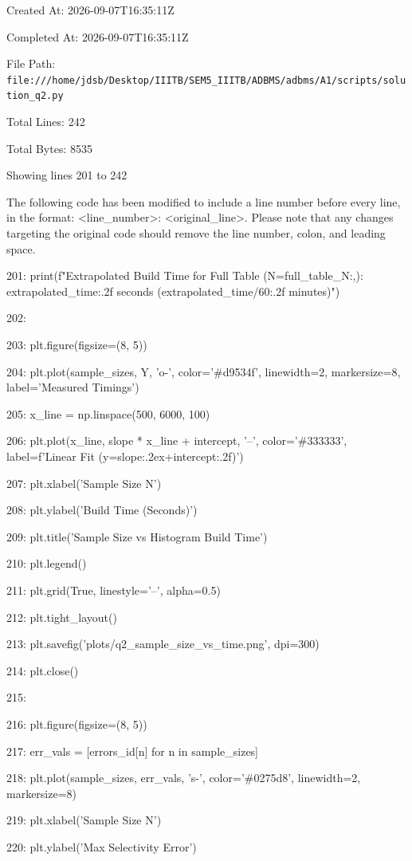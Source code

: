 \documentclass[11pt,a4paper]{article}
\begin{document}
Created At: 2026-09-07T16:35:11Z

Completed At: 2026-09-07T16:35:11Z

File Path: \texttt{file:///home/jdsb/Desktop/IIITB/SEM5\_IIITB/ADBMS/adbms/A1/scripts/solution\_q2.py}

Total Lines: 242

Total Bytes: 8535

Showing lines 201 to 242

The following code has been modified to include a line number before every line, in the format: <line\_number>: <original\_line>. Please note that any changes targeting the original code should remove the line number, colon, and leading space.

201:     print(f"Extrapolated Build Time for Full Table (N={full\_table\_N:,}): {extrapolated\_time:.2f} seconds ({extrapolated\_time/60:.2f} minutes)")

202:

203:     plt.figure(figsize=(8, 5))

204:     plt.plot(sample\_sizes, Y, 'o-', color='\#d9534f', linewidth=2, markersize=8, label='Measured Timings')

205:     x\_line = np.linspace(500, 6000, 100)

206:     plt.plot(x\_line, slope * x\_line + intercept, '--', color='\#333333', label=f'Linear Fit (y={slope:.2e}x+{intercept:.2f})')

207:     plt.xlabel('Sample Size N')

208:     plt.ylabel('Build Time (Seconds)')

209:     plt.title('Sample Size vs Histogram Build Time')

210:     plt.legend()

211:     plt.grid(True, linestyle='--', alpha=0.5)

212:     plt.tight\_layout()

213:     plt.savefig('plots/q2\_sample\_size\_vs\_time.png', dpi=300)

214:     plt.close()

215:

216:     plt.figure(figsize=(8, 5))

217:     err\_vals = [errors\_id[n] for n in sample\_sizes]

218:     plt.plot(sample\_sizes, err\_vals, 's-', color='\#0275d8', linewidth=2, markersize=8)

219:     plt.xlabel('Sample Size N')

220:     plt.ylabel('Max Selectivity Error')
\end{document}
